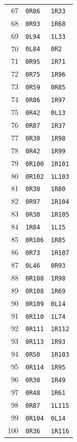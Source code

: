 \begin{longtable}{rll}
67 & \texttt{0R86} & \texttt{1R33}\\
68 & \texttt{0R93} & \texttt{1R68}\\
69 & \texttt{0L94} & \texttt{1L33}\\
70 & \texttt{0L84} & \texttt{0R2}\\
71 & \texttt{0R95} & \texttt{1R71}\\
72 & \texttt{0R75} & \texttt{1R96}\\
73 & \texttt{0R59} & \texttt{0R85}\\
74 & \texttt{0R86} & \texttt{1R97}\\
75 & \texttt{0R42} & \texttt{0L13}\\
76 & \texttt{0R87} & \texttt{1R37}\\
77 & \texttt{0R30} & \texttt{1R98}\\
78 & \texttt{0R42} & \texttt{1R99}\\
79 & \texttt{0R100} & \texttt{1R101}\\
80 & \texttt{0R102} & \texttt{1L103}\\
81 & \texttt{0R30} & \texttt{1R80}\\
82 & \texttt{0R97} & \texttt{1R104}\\
83 & \texttt{0R30} & \texttt{1R105}\\
84 & \texttt{1R84} & \texttt{1L15}\\
85 & \texttt{0R106} & \texttt{1R85}\\
86 & \texttt{0R73} & \texttt{1R107}\\
87 & \texttt{0L46} & \texttt{0R93}\\
88 & \texttt{0R108} & \texttt{1R98}\\
89 & \texttt{0R108} & \texttt{1R69}\\
90 & \texttt{0R109} & \texttt{0L14}\\
91 & \texttt{0R110} & \texttt{1L74}\\
92 & \texttt{0R111} & \texttt{1R112}\\
93 & \texttt{0R113} & \texttt{1R93}\\
94 & \texttt{0R50} & \texttt{1R103}\\
95 & \texttt{0R114} & \texttt{1R95}\\
96 & \texttt{0R30} & \texttt{1R49}\\
97 & \texttt{0R48} & \texttt{1R61}\\
98 & \texttt{0R87} & \texttt{1L115}\\
99 & \texttt{0R104} & \texttt{0L14}\\
100 & \texttt{0R36} & \texttt{1R116}\\

\end{longtable}
